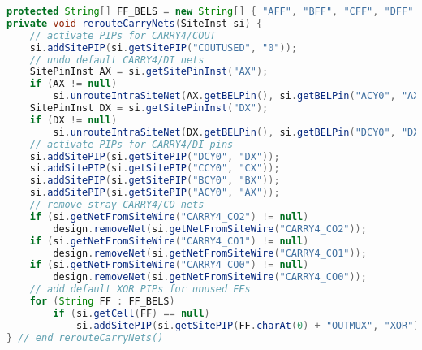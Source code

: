 \begin{lstlisting}[language=java, caption={Manually rerouting intra-Site nets in a \texttt{SLICEL} containing a \texttt{CARRY4} \texttt{Cell}}, label={lst:carry_nets}]
protected String[] FF_BELS = new String[] { "AFF", "BFF", "CFF", "DFF" };
private void rerouteCarryNets(SiteInst si) {
    // activate PIPs for CARRY4/COUT
    si.addSitePIP(si.getSitePIP("COUTUSED", "0"));
    // undo default CARRY4/DI nets
    SitePinInst AX = si.getSitePinInst("AX");
    if (AX != null)
        si.unrouteIntraSiteNet(AX.getBELPin(), si.getBELPin("ACY0", "AX"));
    SitePinInst DX = si.getSitePinInst("DX");
    if (DX != null)
        si.unrouteIntraSiteNet(DX.getBELPin(), si.getBELPin("DCY0", "DX"));
    // activate PIPs for CARRY4/DI pins
    si.addSitePIP(si.getSitePIP("DCY0", "DX"));
    si.addSitePIP(si.getSitePIP("CCY0", "CX"));
    si.addSitePIP(si.getSitePIP("BCY0", "BX"));
    si.addSitePIP(si.getSitePIP("ACY0", "AX"));
    // remove stray CARRY4/CO nets
    if (si.getNetFromSiteWire("CARRY4_CO2") != null)
        design.removeNet(si.getNetFromSiteWire("CARRY4_CO2"));
    if (si.getNetFromSiteWire("CARRY4_CO1") != null)
        design.removeNet(si.getNetFromSiteWire("CARRY4_CO1"));
    if (si.getNetFromSiteWire("CARRY4_CO0") != null)
        design.removeNet(si.getNetFromSiteWire("CARRY4_CO0"));
    // add default XOR PIPs for unused FFs
    for (String FF : FF_BELS)
        if (si.getCell(FF) == null)
            si.addSitePIP(si.getSitePIP(FF.charAt(0) + "OUTMUX", "XOR"));
} // end rerouteCarryNets()
\end{lstlisting}

